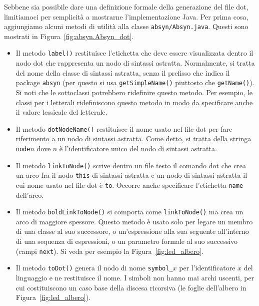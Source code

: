 Sebbene sia possibile dare una definizione formale della generazione
del file dot, limitiamoci per semplicit\`a a mostrarne l'implementazione Java.
Per prima cosa, aggiungiamo alcuni metodi di utilit\`a alla classe
\texttt{absyn/Absyn.java}. Questi sono mostrati in
Figura~\ref{fig:absyn.Absyn_dot}.
\begin{itemize}
\item Il metodo \texttt{label()} restituisce
l'etichetta che deve essere visualizzata dentro il nodo dot che
rappresenta un nodo di sintassi astratta. Normalmente, si tratta del
nome della classe di sintassi astratta, senza il prefisso che indica il
package \texttt{absyn} (per questo si usa \texttt{getSimpleName()}
piuttosto che \texttt{getName()}). Si noti che le sottoclassi potrebbero
ridefinire questo metodo. Per esempio, le classi per i letterali
ridefiniscono questo metodo in modo da specificare anche il valore lessicale
del letterale.
\item Il metodo \texttt{dotNodeName()} restituisce il nome usato nel file dot
per fare riferimento a un nodo di sintassi astratta. Come detto, si tratta
della stringa \texttt{node}$n$ dove $n$ \`e l'identificatore unico del
nodo di sintassi astratta.
\item Il metodo \texttt{linkToNode()} scrive dentro un file testo il comando
dot che crea un arco fra il nodo \texttt{this} di sintassi astratta e un
nodo di sintassi astratta il cui nome usato nel file dot \`e \texttt{to}.
Occorre anche specificare l'etichetta \texttt{name} dell'arco.
\item Il metodo \texttt{boldLinkToNode()} si comporta come
\texttt{linkToNode()} ma crea un arco di maggiore spessore. Questo
metodo \`e usato solo per legare un membro di una classe
al suo successore, o un'espressione alla sua seguente all'interno di
una sequenza di espressioni, o un parametro formale al suo successivo
(campi \texttt{next}). Si veda per esempio la Figura~\ref{fig:led_albero}.
\item Il metodo \texttt{toDot()} genera il nodo di nome \texttt{symbol\_}$x$
per l'identificatore $x$ del linguaggio e ne restituisce il nome.
I simboli non hanno mai archi uscenti, per
cui costituiscono un caso base della discesa ricorsiva (le foglie
dell'albero in Figura~\ref{fig:led_albero}).
\end{itemize}
%
